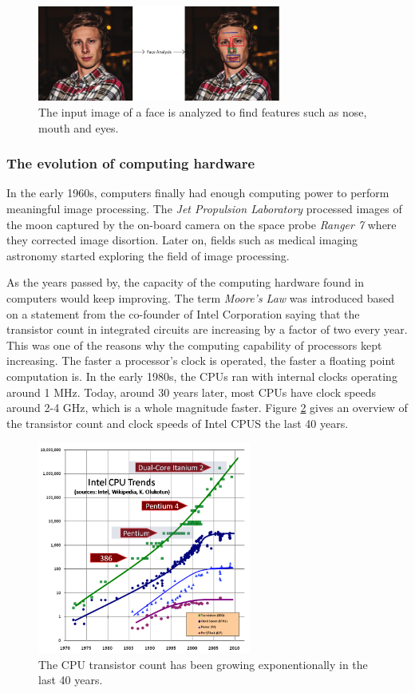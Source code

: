 \begin{figure}[ht!]
\centering
\includegraphics[width=80mm]{img/feature.pdf}
\caption{The input image of a face is analyzed to find features such as nose, mouth and eyes.}
\label{feature}
\end{figure}

\subsubsection{The evolution of computing hardware}

In the early 1960s, computers finally had enough computing power to perform meaningful image processing. The \emph{Jet Propulsion Laboratory} processed images of the moon captured by the on-board camera on the space probe \emph{Ranger 7} where they corrected image disortion. Later on, fields such as medical imaging astronomy started exploring the field of image processing. 
\newline

As the years passed by, the capacity of the computing hardware found in computers would keep improving. The term \emph{Moore's Law} was introduced based on a statement from the co-founder of Intel Corporation saying that the transistor count in integrated circuits are increasing by a factor of two every year. This was one of the reasons why the computing capability of processors kept increasing. The faster a processor's clock is operated, the faster a floating point computation is. In the early 1980s, the CPUs ran with internal clocks operating around 1 MHz. Today, around 30 years later, most CPUs have clock speeds around 2-4 GHz, which is a whole magnitude faster. Figure \ref{intelcpu} gives an overview of the transistor count and clock speeds of Intel CPUS the last 40 years.
\newline
\begin{figure}[ht!]
\centering
\includegraphics[width=70mm]{img/CPU.png}
\caption{The CPU transistor count has been growing exponentionally in the last 40 years.}
\label{intelcpu}
\end{figure}

